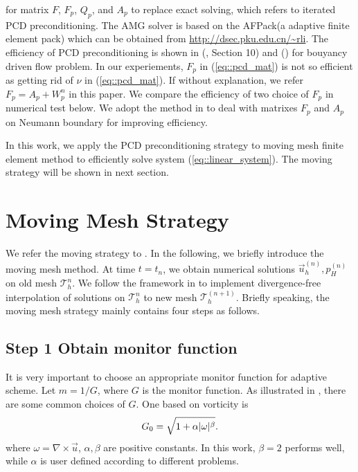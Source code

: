 \documentclass{eajam}
\begin{document}
  for matrix $F$, $F_p$, $Q_p$, and $A_p$ to replace exact solving,
  which refers to iterated PCD preconditioning. The AMG solver is
  based on the AFPack(a adaptive finite element pack) which can be
  obtained from \url{http://dsec.pku.edu.cn/~rli}. The efficiency of
  PCD preconditioning is shown in (\cite{elman2005finite},
  Section 10) and (\cite{elman2011fast}) for bouyancy driven flow
  problem. In our experiements, $F_p$ in (\ref{eq::pcd_mat}) is not so
  efficient as getting rid of $\nu$ in (\ref{eq::pcd_mat}). If without
  explanation, we refer $F_p = A_p + W_p^n$ in this paper. We compare
  the efficiency of two choice of $F_p$ in numerical test below. We
  adopt the method in \cite{elman2009boundary} to deal with matrixes
  $F_p$ and $A_p$ on Neumann boundary for improving efficiency.
  
  In this work, we apply the PCD preconditioning strategy to moving mesh
  finite element method to efficiently solve system
  (\ref{eq::linear_system}). The moving strategy will be shown in next
  section.
 
\section{Moving Mesh Strategy}
   \label{sec4} We refer the moving strategy to
   \cite{di2005moving}. In the following, we briefly introduce the
   moving mesh method. At time $t = t_{n}$, we obtain  numerical
   solutions $\vec{u}_h^{(n)}, p_H^{(n)}$ on old 
   mesh $\mathcal{T}_h^n$. We follow the framework in
   \cite{di2005moving} to implement divergence-free 
   interpolation of solutions on $\mathcal{T}_h^n$ to new mesh
   $\mathcal{T}_h^{(n + 1)}$. Briefly speaking, the moving mesh
   strategy mainly contains four steps as follows.
   \subsection{Step 1 Obtain monitor function}
      It is very important to choose an appropriate monitor function for
      adaptive scheme. Let $m = 1/G$, where $G$ is the monitor
      function. As illustrated in \cite{di2005moving}, there are some
      common choices of $G$. One based on vorticity is 
      \begin{equation} 
        \centering
        G_0 = \sqrt{1 + \alpha |\omega|^\beta}.
        \label{eq::monitor_vorticity}
      \end{equation}
      where $\omega = \nabla \times \vec{u}$, $\alpha, \beta$
      are positive constants. In this work, $\beta = 2$ performs 
      well, while $\alpha$ is user defined according to different
      problems. 
\end{document}
